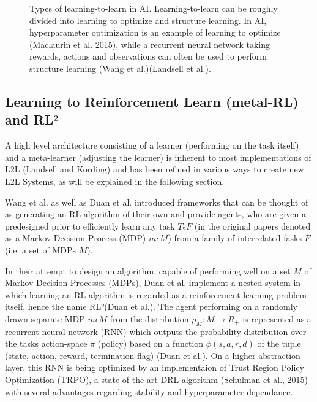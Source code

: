 \documentclass[letterpaper, 10 pt, conference]{ieeeconf}  %
\begin{document}
\begin{figure}[thpb]
        \centering
  \caption{Types of learning-to-learn in AI. Learning-to-learn can be roughly divided into learning to optimize and structure learning.
  In AI, hyperparameter optimization is
  an example of learning to optimize (Maclaurin et al. 2015), while a recurrent neural network taking rewards, actions and observations
   can often be used to perform structure learning (Wang et al.)(Landsell et al.).}
        \label{figurelabel}
     \end{figure}


\subsection{Learning to Reinforcement Learn (metal-RL) and RL²}

A high level architecture consisting of a learner (performing on the task itself) and a meta-learner (adjusting the learner) is
inherent to most implementations of L2L (Landsell and Kording) and has been refined in various ways to create new L2L Systems, as will be
explained in the following section.

Wang et al. as well as Duan et al. introduced frameworks that can be thought of as generating an RL algorithm of their own and
provide agents, who are given a predesigned prior to efficiently learn any task $T \epsilon F$ (in the original papers denoted as 
a Markov Decision Process (MDP) $m \epsilon M$) from a family of interrelated fasks $F$(i.e. a set of MDPs $M$). 

In their attempt to design an algorithm, capable of performing well on a set $M$ of Markov Decision Processes (MDPs), Duan et al. implement a nested
system in which learning an RL algorithm is regarded as a reinforcement learning problem itself, hence the name RL²(Duan et al.). The agent performing 
on a randomly drawn separate MDP $m \epsilon M$ from the distribution $\rho_{M} : M \longrightarrow R_{+}$ is represented as a recurrent neural
network (RNN) which outputs the probability distribution over the tasks action-space $\pi$ (policy) based on a function $\phi (s,a,r,d)$ of 
the tuple (state, action, reward, termination flag) (Duan et al.). On a higher abstraction layer, this RNN is being 
optimized by an implementaion of Trust Region Policy Optimization (TRPO), a 
state-of-the-art DRL algorithm (Schulman et al., 2015) with several advantages regarding stability and hyperparameter dependance.\newline
\end{document}
